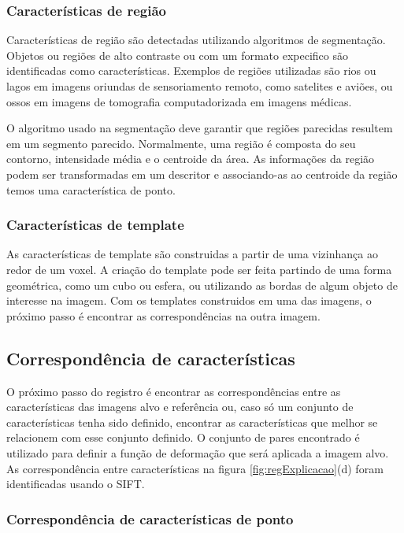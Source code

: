 \subsubsection{Características de região}

  Características de região são detectadas utilizando algoritmos de segmentação.
Objetos ou regiões de alto contraste ou com um formato expecifico são identificadas
como características. Exemplos de regiões utilizadas são rios ou lagos em imagens
oriundas de sensoriamento remoto, como satelites e aviões, ou ossos em imagens
de tomografia computadorizada em imagens médicas.

  O algoritmo usado na segmentação deve garantir que regiões parecidas resultem
em um segmento parecido. Normalmente, uma região é composta do seu contorno,
intensidade média e o centroide da área. As informações da região podem
ser transformadas em um descritor e associando-as ao centroide da região
temos uma característica de ponto.

\subsubsection{Características de template}

  As características de template são construidas a partir de uma vizinhança
ao redor de um voxel. A criação do template pode ser feita partindo de uma
forma geométrica, como um cubo ou esfera, ou utilizando as bordas de algum
objeto de interesse na imagem. Com os templates construidos em uma das imagens,
o próximo passo é encontrar as correspondências na outra imagem.

\subsection{Correspondência de características}

  O próximo passo do registro é encontrar as correspondências entre as características
das imagens alvo e referência ou, caso só um conjunto de características tenha sido
definido, encontrar as características que melhor se relacionem com esse conjunto
definido. O conjunto de pares encontrado é utilizado para definir a função de
deformação que será aplicada a imagem alvo. As correspondência entre características
na figura \ref{fig:regExplicacao}(d) foram identificadas usando o SIFT.

\subsubsection{Correspondência de características de ponto}

